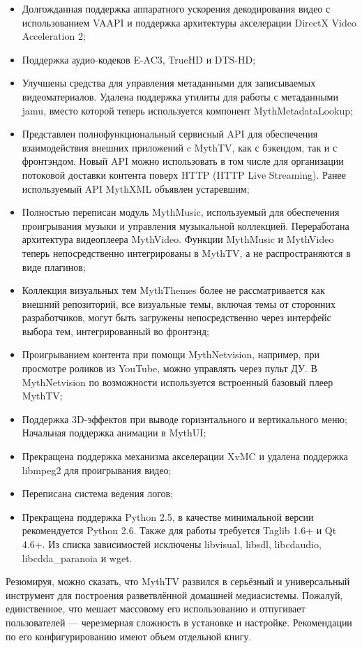 \documentclass[10pt, a5paper]{article}
\begin{document}
\begin{itemize}
  \item Долгожданная поддержка аппаратного ускорения декодирования видео с использованием VAAPI и поддержка архитектуры акселерации DirectX Video Acceleration 2;
  \item Поддержка аудио-кодеков E-AC3, TrueHD и DTS-HD;
  \item Улучшены средства для управления метаданными для записываемых видеоматериалов. Удалена поддержка утилиты для работы с метаданными jamu, вместо которой теперь используется компонент MythMetadataLookup;
  \item Представлен полнофункциональный сервисный API для обеспечения взаимодействия внешних приложений c MythTV, как с бэкендом, так и с фронтэндом. Новый API можно использовать в том числе для организации потоковой доставки контента поверх HTTP (HTTP Live Streaming). Ранее используемый API MythXML объявлен устаревшим;
  \item Полностью переписан модуль MythMusic, используемый для обеспечения проигрывания музыки и управления музыкальной коллекцией. Переработана архитектура видеоплеера \linebreak MythVideo. Функции MythMusic и MythVideo теперь непосредственно интегрированы в MythTV, а не распространяются в виде плагинов;
  \item Коллекция визуальных тем MythThemes более не рассматривается как внешний репозиторий, все визуальные темы, включая темы от сторонних разработчиков,  могут быть загружены непосредственно через интерфейс выбора тем, интегрированный во фронтэнд;
  \item Проигрыванием контента при помощи MythNetvision, например, при просмотре роликов из YouTube, можно управлять через пульт ДУ. В MythNetvision по возможности используется встроенный базовый плеер MythTV;
  \item Поддержка 3D-эффектов при выводе горизнтального и вертикального меню; 
Начальная поддержка анимации в MythUI;
  \item Прекращена поддержка механизма акселерации XvMC и удалена поддержка libmpeg2 для проигрывания видео;
  \item Переписана система ведения логов;
  \item Прекращена поддержка Python 2.5, в качестве минимальной версии рекомендуется Python 2.6. Также для работы требуется Taglib 1.6+ и Qt 4.6+. Из списка зависимостей исключены libvisual, libsdl, libcdaudio, libcdda\_paranoia и wget.
\end{itemize}

Резюмируя, можно сказать, что MythTV развился в серьёзный и универсальный инструмент для построения разветвлённой домашней медиасистемы. Пожалуй,  единственное, что мешает массовому его использованию и отпугивает пользователей --- черезмерная  сложность в установке и настройке. Рекомендации по его конфигурированию имеют объем отдельной книгу.
\end{document}
